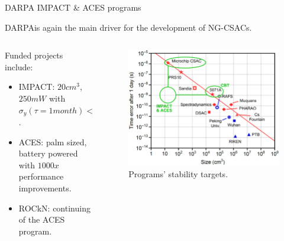 \begin{frame}{DARPA IMPACT \& ACES programs}

    DARPA\footnotemark[1] is again the main driver for the development of NG-CSACs.

    \vspace{10pt}

    \begin{columns}[c, onlytextwidth]

        \begin{column}{0.5\textwidth}

            Funded projects include:

            \begin{itemize}
                \item IMPACT\footnotemark[2]: $20cm^3$, $250mW$ with $\sigma_y(\tau=1month) < 160ns$.
                \item ACES\footnotemark[3]: palm sized, battery powered with $1000x$ performance improvements.
                \item ROCkN\footnotemark[4]: continuing of the ACES program.
            \end{itemize}

        \end{column}

        \hfill

        \begin{column}{0.45\textwidth}

            \begin{figure}
                \centering
                \includegraphics[width=\textwidth]{img/DARPA-stability-target.jpg}
                \caption{Programs' stability targets.}
            \end{figure}


\end{column}
\end{columns}
\end{frame}
